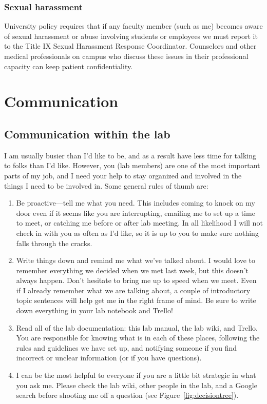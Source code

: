 \documentclass[letterpaper,12pt,oneside]{memoir}
\begin{document}
\subsection{Sexual harassment}
University policy requires that if any faculty member (such as me) becomes aware of sexual harassment or abuse involving students or employees we must report it to the Title IX Sexual Harassment Response Coordinator. Counselors and other medical professionals on campus who discuss these issues in their professional capacity can keep patient confidentiality.



\chapter{Communication}
\section{Communication within the lab}
\label{sec:communicationInLab}

I am usually busier than I'd like to be, and as a result have less time for talking to folks than I'd like. However, you (lab members) are one of the most important parts of my job, and I need your help to stay organized and involved in the things I need to be involved in. Some general rules of thumb are:

\begin{enumerate}
\item Be proactive---tell me what you need. This includes coming to knock on my door even if it seems like you are interrupting, emailing me to set up a time to meet, or catching me before or after lab meeting. In all likelihood I will not check in with you as often as I'd like, so it is up to you to make sure nothing falls through the cracks.

\item Write things down and remind me what we've talked about. I would love to remember everything we decided when we met last week, but this doesn't always happen. Don't hesitate to bring me up to speed when we meet. Even if I already remember what we are talking about, a couple of introductory topic sentences will help get me in the right frame of mind. Be sure to write down everything in your lab notebook and Trello!

\item Read all of the lab documentation: this lab manual, the lab wiki, and Trello. You are responsible for knowing what is in each of these places, following the rules and guidelines we have set up, and notifying someone if you find incorrect or unclear information (or if you have questions).

\item I can be the most helpful to everyone if you are a little bit strategic in what you ask me. Please check the lab wiki, other people in the lab, and a Google search before shooting me off a question (see Figure~\ref{fig:decisiontree}).

\end{enumerate}
\end{document}
